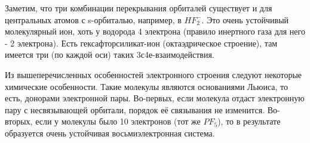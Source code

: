 	\par\smallskip
	
	Заметим, что три комбинации перекрывания орбиталей существует и для центральных атомов с s-орбиталью, например, в $HF_2^-$. Это очень устойчивый молекулярный ион, хоть у водорода 4 электрона (правило
	инертного газа для него - 2 электрона). Есть гексафторсиликат-ион (октаэдрическое строение), там имеется три (по каждой оси) таких 3с4е-взаимодействия.
	
	\par\smallskip
	
	Из вышеперечисленных особенностей электронного строения следуют некоторые химические особенности. Такие молекулы являются основаниями Льюиса, то есть, донорами электронной пары. Во-первых,
	если молекула отдаст электронную пару с несвязывающей орбитали, порядок её связывания не изменится. Во-вторых, если у молекулы было 10 электронов (тот же $PF_5$), то в результате образуется очень
	устойчивая восьмиэлектронная система. 
	
	
	\par\bigskip
	\par\bigskip
	